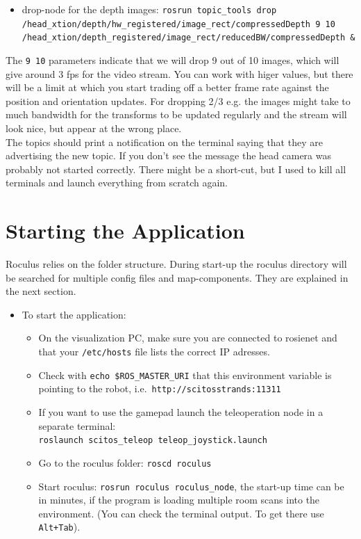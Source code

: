 \documentclass[a4paper, 12pt]{article}
\begin{document}
\begin{itemize}
\begin{itemize}
  \item drop-node for the depth images: \texttt{rosrun topic\_tools drop\\ /head\_xtion/depth/hw\_registered/image\_rect/compressedDepth 9 10 \\/head\_xtion/depth\_registered/image\_rect/reducedBW/compressedDepth \&}
  \end{itemize}
The \texttt{9 10} parameters indicate that we will drop 9 out of 10 images, which will give around 3 fps for the video stream. You can work with higer values, but there will be a limit at which you start trading off a better frame rate against the position and orientation updates. For dropping 2/3 e.g. the images might take to much bandwidth for the transforms to be updated regularly and the stream will look nice, but appear at the wrong place.\\
The topics should print a notification on the terminal saying that they are advertising the new topic. If you don't see the message the head camera was probably not started correctly. There might be a short-cut, but I used to kill all terminals and launch everything from scratch again.
\end{itemize}

\section{Starting the Application}
Roculus relies on the folder structure. During start-up the roculus directory will be searched for multiple config files and map-components. They are explained in the next section.
\begin{itemize}
\item To start the application:
  \begin{itemize}
  \item On the visualization PC, make sure you are connected to rosienet and that your \texttt{/etc/hosts} file lists the correct IP adresses.
  \item Check with \texttt{echo \$ROS\_MASTER\_URI} that this environment variable is pointing to the robot, i.e.\ \texttt{http://scitosstrands:11311}
  \item If you want to use the gamepad launch the teleoperation node in a separate terminal:\\\texttt{roslaunch scitos\_teleop teleop\_joystick.launch}
  \item Go to the roculus folder: \texttt{roscd roculus}
  \item Start roculus: \texttt{rosrun roculus roculus\_node}, the start-up time can be in minutes, if the program is loading multiple room scans into the environment. (You can check the terminal output. To get there use \texttt{Alt+Tab}).
  \end{itemize}
\end{itemize}
\end{document}
